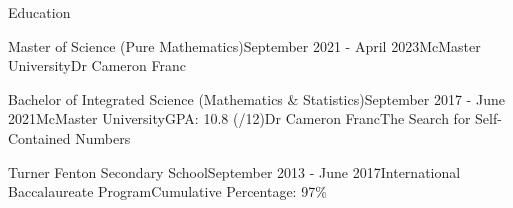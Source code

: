 \begin{rSection}{Education}

\begin{edSubsectionFull}{Master of Science (Pure Mathematics)}{September 2021 - April 2023}{McMaster University}{}{Dr Cameron Franc}{}
\end{edSubsectionFull}

\begin{edSubsectionFull}{Bachelor of Integrated Science (Mathematics \& Statistics)}{September 2017 - June 2021}{McMaster University}{GPA: 10.8 (/12)}{Dr Cameron Franc}{The Search for Self-Contained Numbers}
\end{edSubsectionFull}


\begin{edSubsectionMin}{Turner Fenton Secondary School}{September 2013 - June 2017}{International Baccalaureate Program}{Cumulative Percentage: 97\%}
\end{edSubsectionMin}

\end{rSection}